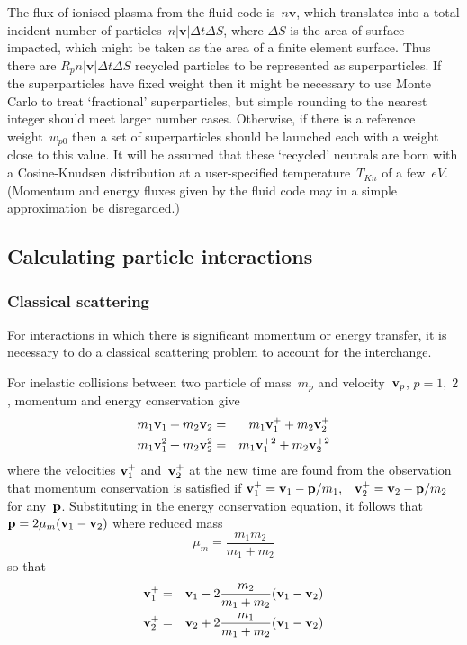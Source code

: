 The flux of ionised plasma from the fluid code is~$n\mathbf{v}$,
which translates into a total incident number of particles~$n|\mathbf{v}|\Delta t \Delta S$,
where $\Delta S$ is the area of surface impacted, which might be taken as
the area of a finite element surface. Thus there are $R_pn|\mathbf{v}|\Delta t \Delta S$
recycled particles to be represented as superparticles. If the superparticles have fixed weight then
it might be necessary to use Monte Carlo to treat `fractional' superparticles, but
simple rounding to the nearest integer should meet larger number cases.
Otherwise, if there is a reference weight~$w_{p0}$ then a set of superparticles
should be launched each with a weight close to this value.
It will be assumed that these `recycled' neutrals are born
with a Cosine-Knudsen distribution at a user-specified temperature~$T_{Kn}$ of a few~$eV$.
(Momentum and energy fluxes given by the fluid code may in a simple approximation
be disregarded.)

\subsection{Calculating particle interactions}\label{sec:33na}
\subsubsection{Classical scattering}\label{sec:classcat}
For interactions in which there is significant momentum or energy
transfer, it is necessary to do a classical scattering problem to
account for the interchange. 

For inelastic collisions between two particle of mass~$m_p$ and velocity~${\bf v}_p$,
$p=1,\;2$, momentum and energy conservation give
\begin{eqnarray}\label{eq:mtmecons}
m_1 {\bf v}_1 + m_2 {\bf v}_2 & = & m_1 {\bf v}^+_1 + m_2 {\bf v}^+_2 \\
m_1 {\bf v}^2_1 + m_2 {\bf v}^2_2 & = & m_1 {\bf v}^{+2}_1 + m_2 {\bf v}^{+2}_2 
\end{eqnarray}
where the velocities ${\bf v}^+_1$ and~${\bf v}^+_2$ at the new time 
are found from the observation that momentum conservation is satisfied if
${\bf v}^+_1 = {\bf v}_1- {\bf p}/m_1,\;\;\;{\bf v}^+_2 = {\bf v}_2- {\bf p}/m_2$
for any~${\bf p}$. Substituting in the energy conservation equation, it follows that
${\bf p}= 2\mu_m ({\bf v}_1- {\bf v}_2)$
where reduced mass
\begin{equation}
\mu_m=\frac{m_1 m_2}{m_1+m_2}
\end{equation}
so that 
\begin{eqnarray}\label{eq:v12+}
{\bf v}^+_1 & = & {\bf v}_1 - 2 \frac{m_2}{m_1+m_2} ({\bf v}_1- {\bf v}_2)\\
{\bf v}^+_2 & = & {\bf v}_2 + 2 \frac{m_1}{m_1+m_2} ({\bf v}_1- {\bf v}_2)
\end{eqnarray}


